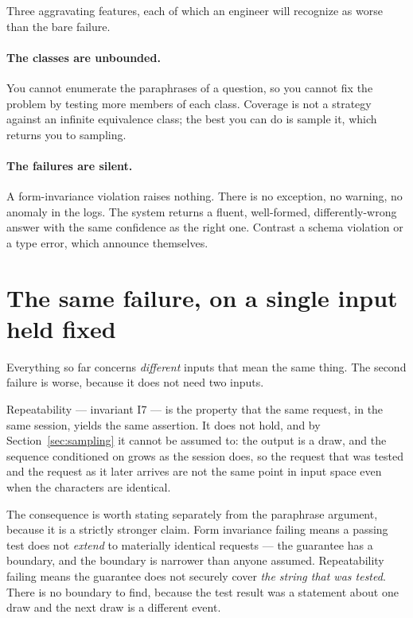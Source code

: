 Three aggravating features, each of which an engineer will recognize as worse than
the bare failure.

\paragraph{The classes are unbounded.} You cannot enumerate the paraphrases of a
question, so you cannot fix the problem by testing more members of each class.
Coverage is not a strategy against an infinite equivalence class; the best you can
do is sample it, which returns you to sampling.

\paragraph{The failures are silent.} A form-invariance violation raises nothing. There is no
exception, no warning, no anomaly in the logs. The system returns a fluent,
well-formed, differently-wrong answer with the same confidence as the right one.
Contrast a schema violation or a type error, which announce themselves.

\section{The same failure, on a single input held fixed}
\label{sec:repeatability-fails}

Everything so far concerns \emph{different} inputs that mean the same thing. The
second failure is worse, because it does not need two inputs.

Repeatability --- invariant I7 --- is the property that the same request, in the same
session, yields the same assertion. It does not hold, and by
Section~\ref{sec:sampling} it cannot be assumed to: the output is a draw, and the
sequence conditioned on grows as the session does, so the request that was tested and
the request as it later arrives are not the same point in input space even when the
characters are identical.

The consequence is worth stating separately from the paraphrase argument, because it
is a strictly stronger claim. Form invariance failing means a passing test does not
\emph{extend} to materially identical requests --- the guarantee has a boundary, and
the boundary is narrower than anyone assumed. Repeatability failing means the
guarantee does not securely cover \emph{the string that was tested}. There is no
boundary to find, because the test result was a statement about one draw and the
next draw is a different event.

